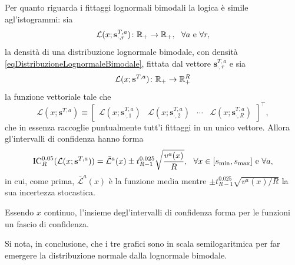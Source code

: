                 Per quanto riguarda i fittaggi lognormali bimodali la logica è simile agl'istogrammi: sia
                \begin{equation*}
                    \mathcal L(x;\mathbf s^{T,a}_{\cdot,r})\colon\mathbb R_+\to\mathbb R_+,
                    \ \ \forall a\text{ e }\forall r,
                \end{equation*}
                la densità di una distribuzione lognormale bimodale, con densità \cref{eqDistribuzioneLognormaleBimodale}, fittata dal vettore \(\mathbf s^{T,a}_{\cdot,r}\) e sia
                \begin{equation*}
                    \mathcal L(x;\mathbf s^{T,a})\colon\mathbb R_+\to\mathbb R_+^R
                \end{equation*}
                la funzione vettoriale tale che
                \begin{equation*}
                    \mathcal L(x;\mathbf s^{T,a})\equiv
                    \begin{bmatrix}
                        \mathcal L(x;\mathbf s^{T,a}_{\cdot,1})&
                        \mathcal L(x;\mathbf s^{T,a}_{\cdot,2})&
                        \cdots&
                        \mathcal L(x;\mathbf s^{T,a}_{\cdot,R})
                    \end{bmatrix}^\top,
                \end{equation*}
                che in essenza raccoglie puntualmente tutt'i fittaggi in un unico vettore. Allora gl'intervalli di confidenza hanno forma
                \begin{equation*}
                    \operatorname{IC}_R^{0.05}(\mathcal L(x;\mathbf s^{T,a}))=
                    \bar{\mathcal L}^a(x)\pm t^{0.025}_{R-1}\sqrt{\frac{v^a(x)}R},
                    \ \ \forall x\in[s_{\min},s_{\max}]\text{ e }\forall a,
                \end{equation*}
                in cui, come prima, \(\bar{\mathcal L}^a(x)\) è la funzione media mentre \(\pm t^{0.025}_{R-1}\sqrt{v^a(x)/R}\) la sua incertezza stocastica.

                \begin{oss}
                    Essendo \(x\) continuo, l'insieme degl'intervalli di confidenza forma per le funzioni un fascio di confidenza.
                \end{oss}

                Si nota, in conclusione, che i tre grafici sono in scala semilogaritmica per far emergere la distribuzione normale dalla lognormale bimodale.

